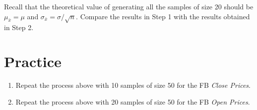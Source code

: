 \documentclass[
]{book}
\providecommand{\tightlist}{%
  \setlength{\itemsep}{0pt}\setlength{\parskip}{0pt}}
\begin{document}
Recall that the theoretical value of generating all the samples of size 20 should be \(\mu_{\bar{x}}=\mu\) and \(\sigma_{\bar{x}}=\sigma/\sqrt{n}\). Compare the results in Step 1 with the results obtained in Step 2.

\hypertarget{practice-10}{%
\section{Practice}\label{practice-10}}

\begin{enumerate}
\def\labelenumi{\arabic{enumi}.}
\tightlist
\item
  Repeat the process above with 10 samples of size 50 for the FB \emph{Close Prices}.
\item
  Repeat the process above with 20 samples of size 50 for the FB \emph{Open Prices}.
\end{enumerate}

  
\end{document}
